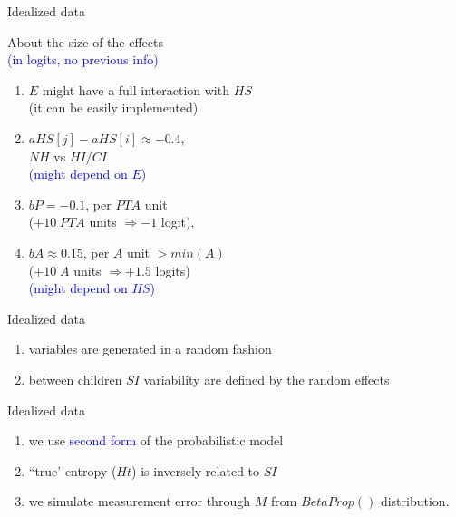 \begin{lhframe}[rhgraphic={\texttt{[image: sim\_code1.png]}}]
	{Idealized data}
	
	About the size of the effects \\
	{\small \textcolor{blue}{(in logits, no previous info)} }
	\begin{enumerate}
		\item $E$ might have a full interaction with $HS$ \\
		{\small (it can be easily implemented)}
		\item $aHS[j] - aHS[i] \approx -0.4$, \\
		$NH$ vs $HI/CI$ \\
		{\small \textcolor{blue}{(might depend on $E$)} }
		\item $bP=-0.1$, per $PTA$ unit \\
		($+10 \; PTA$ units $\Rightarrow -1$ logit),
		\item $bA \approx 0.15$, per $A$ unit $>min(A)$ \\
		($+10 \; A$ units $\Rightarrow +1.5$ logits) \\
		{\small \textcolor{blue}{(might depend on $HS$)} }
	\end{enumerate}
\end{lhframe}
%
%
\begin{lhframe}[rhgraphic={\texttt{[image: sim\_code2.png]}}]
	{Idealized data}
	
	\begin{enumerate}
		\item variables are generated in a random fashion 
		\item between children $SI$ variability are defined by the random effects
	\end{enumerate}
\end{lhframe}
%
%
\begin{lhframe}[rhgraphic={\texttt{[image: sim\_code3.png]}}]
	{Idealized data}
	
	\begin{enumerate}
		\item we use \textcolor{blue}{second form} of the probabilistic model
		\item ``true' entropy ($Ht$) is inversely related to $SI$
		\item we simulate measurement error through $M$ from $BetaProp()$ distribution.
	\end{enumerate}
\end{lhframe}
